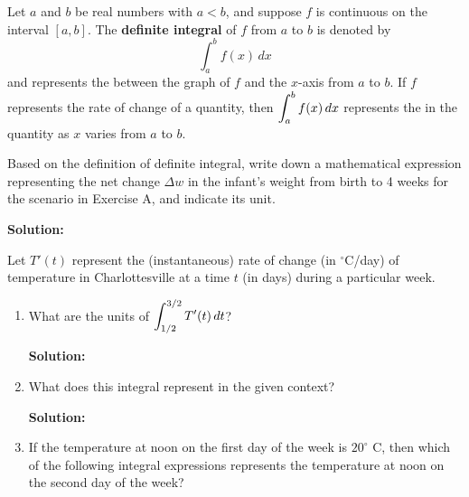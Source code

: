 \documentclass[10pt]{article}
\newcommand{\solution}{%
  \vspace{0.2in}%
  \noindent\textbf{\color{blue}Solution: }%
}
\begin{document}
{
Let $a$ and $b$ be real numbers with $a<b$, and suppose $f$ is continuous on the interval $[a,b]$. The {\bf definite integral} of $f$ from $a$ to $b$ is denoted by \[\int_a^b f(x)\,dx\] and represents the \emph{\underline{}} between the graph of $f$ and the $x$-axis from $a$ to $b$. If $f$ represents the rate of change of a quantity, then $\displaystyle \int_a^b f(x)\,dx$ represents the \emph{\underline{}} in the quantity as $x$ varies from $a$ to $b$.
}

\example Based on the definition of definite integral, write down a mathematical expression representing the net change $\Delta w$ in the infant's weight from birth to 4 weeks for the scenario in Exercise A, and indicate its unit.

\solution
{}

{\exercise} Let $T'(t)$ represent the (instantaneous) rate of change (in $^{\circ}$C/day) of temperature in Charlottesville at a time $t$ (in days) during a particular week. 

\begin{enumerate}
\item[(a)] What are the units of $\displaystyle \int_{1/2}^{3/2} T'(t)\,dt$? 

\solution
{}

\item[(b)] What does this integral represent in the given context?

\solution
{}

\item[(c)] If the temperature at noon on the first day of the week is $20^{\circ}$ C, then which of the following integral expressions represents the temperature at noon on the second day of the week?
\end{enumerate}
\end{document}
